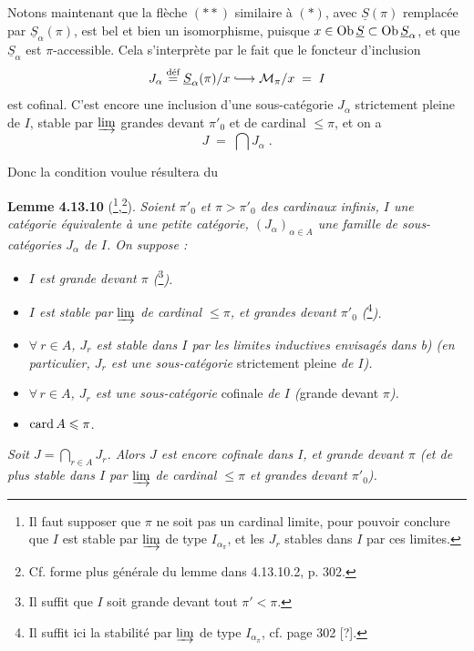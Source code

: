 Notons maintenant que la flèche $(**)$ similaire à $(*)$, avec $\underline{S}(\pi)$ remplacée par $\underline{S}_\alpha(\pi)$, est bel et bien un isomorphisme, puisque $x\in\operatorname{Ob}\underline{S}\subset\operatorname{Ob}\underline{S}_\alpha$, et que $\underline{S}_\alpha$ est $\pi$-accessible. Cela s'interprète par le fait que le foncteur d'inclusion
\[ J_\alpha \overset{\text{déf}}{=} \underline{S}_\alpha(\pi)/x \incl \mathcal{M}_\pi/x \; = \; I \]
est cofinal. C'est encore une inclusion d'une sous-catégorie $J_\alpha$ strictement pleine de $I$, stable par $\varinjlim$ grandes devant $\pi'_0$ et de cardinal $\leqslant\pi$, et on a
\[ J \; = \; \bigcap J_\alpha \; . \]

Donc la condition voulue résultera du

\textbf{Lemme 4.13.10} (\footnote[125]{Il faut supposer que $\pi$ ne soit pas un cardinal limite, pour pouvoir conclure que $I$ est stable par $\varinjlim$ de type $I_{\alpha_\pi}$, et les $J_r$ stables dans $I$ par ces limites.},\footnote[126]{Cf. forme plus générale du lemme dans 4.13.10.2, p. 302.}). \textit{Soient $\pi'_0$ et $\pi>\pi'_0$ des cardinaux infinis, $I$ une catégorie équivalente à une petite catégorie, $(J_\alpha)_{\alpha\in A}$ une famille de sous-catégories $J_\alpha$ de $I$. On suppose :}
\begin{itemize}
\item[\cercle{a}] \textit{$I$ est grande devant $\pi$ (}\footnote[127]{Il suffit que $I$ soit grande devant tout $\pi'<\pi$.}\textit{).} %
\item[\cercle{b}] \textit{$I$ est stable par $\varinjlim$ de cardinal $\leqslant\pi$, et grandes devant $\pi'_0$ (}\footnote[128]{Il suffit ici la stabilité par $\varinjlim$ de type $I_{\alpha_\pi}$, cf. page 302 [?].}\textit{).} %
\end{itemize}

\begin{itemize}
\item[\cercle{c}] \textit{$\forall\ r\in A$, $J_r$ est stable dans $I$ par les limites inductives envisagés dans b) (en particulier, $J_r$ est une sous-catégorie} strictement pleine \textit{de $I$).} %
\item[\cercle{d}] \textit{$\forall\, r\in A$, $J_r$ est une sous-catégorie} cofinale \textit{de $I$ (}grande devant $\pi$\textit{).}
\item[\cercle{e}] $\operatorname{card} A\leqslant\pi$.
\end{itemize}
\textit{Soit $J=\bigcap_{r\in A}J_r$. Alors $J$ est encore cofinale dans $I$, et grande devant $\pi$ (et de plus stable dans $I$ par $\varinjlim$ de cardinal $\leqslant\pi$ et grandes devant $\pi'_0$).}

